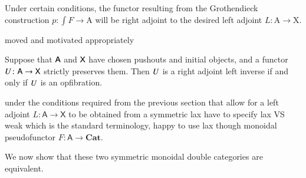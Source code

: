 \documentclass{amsart}
\begin{document}
Under certain conditions, the functor resulting from the Grothendieck construction $p \colon \int{F} \to \mathrm{A}$ will be right adjoint to the desired left adjoint $L \colon \mathrm{A} \to \mathrm{X}$.

{\chris  moved and motivated appropriately}
\begin{thm}\label{thm:mainthmDX}\cite{CV}
Suppose that $\mathsf{A}$ and $\mathsf{X}$ have chosen pushouts and initial objects, and a functor $U\colon\mathsf{A}\to\mathsf{X}$ strictly preserves them. Then $U$ is a right adjoint left inverse if and only if $U$ is an opfibration.
\end{thm}





under the conditions required from the previous section that allow for a left adjoint $L \colon \mathsf{A} \to \mathsf{X}$ to be obtained from a symmetric lax {\chris have to specify lax VS weak which is the standard terminology, happy to use lax though} monoidal pseudofunctor $F \colon \mathsf{A} \to \mathbf{Cat}$.

We now show that these two symmetric monoidal double categories are equivalent. 
\end{document}
